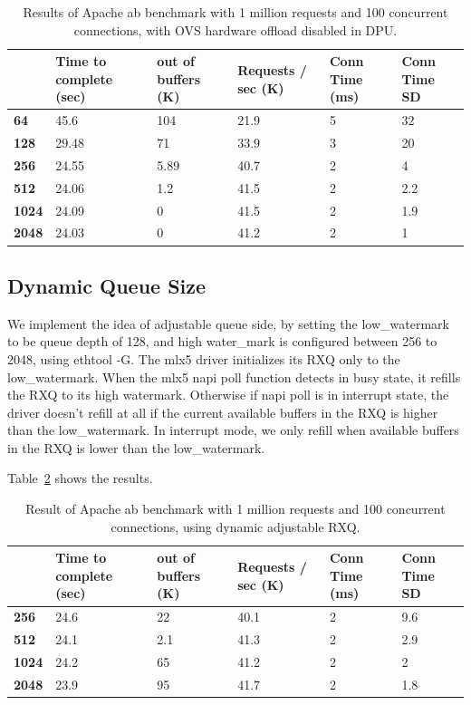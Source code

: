 \documentclass[letterpaper]{article}
\begin{document}
\begin{table}[h!]
\centering
\footnotesize
\begin{tabular}{|p{0.6cm}|p{1.2cm}|p{1.2cm}|p{1.2cm}|p{0.8cm}|p{1cm}|} \hline
\textbf{} & \textbf{Time to complete (sec)} & \textbf{out of buffers (K)} & \textbf{Requests / sec (K)} & \textbf{Conn Time (ms)} & \textbf{Conn Time SD} \\ \hline \hline
\textbf{64}   & 45.6  & 104   & 21.9 & 5 & 32  \\ \hline
\textbf{128}  & 29.48 & 71    & 33.9 & 3 & 20  \\ \hline \hline
\textbf{256}  & 24.55 & 5.89  & 40.7 & 2 & 4   \\ \hline
\textbf{512}  & 24.06 & 1.2   & 41.5 & 2 & 2.2 \\ \hline
\textbf{1024} & 24.09 & 0     & 41.5 & 2 & 1.9 \\ \hline
\textbf{2048} & 24.03 & 0     & 41.2 & 2 & 1   \\ \hline
\end{tabular}
\caption{Results of Apache ab benchmark with 1 million requests and 100 concurrent
connections, with OVS hardware offload disabled in DPU.}
\label{tab:ab1}
\end{table}


\subsection{Dynamic Queue Size}
We implement the idea of adjustable queue side, by setting the low\_watermark to
be queue depth of 128, and high water\_mark is configured between 256 to 2048, using
ethtool -G. The mlx5 driver initializes its RXQ only to the low\_watermark.
When the mlx5 napi poll function detects in busy state, it refills the
RXQ to its high watermark. Otherwise if napi poll is in interrupt state, the driver
doesn't refill at all if the current available buffers in the RXQ is higher than
the low\_watermark. In interrupt mode, we only refill when available buffers in the RXQ
is lower than the low\_watermark.

Table~\ref{tab:ab2} shows the results.
\begin{table}[h!]
\centering
\footnotesize
\begin{tabular}{|p{0.6cm}|p{1.2cm}|p{1.2cm}|p{1.2cm}|p{0.8cm}|p{1cm}|} \hline
\textbf{} & \textbf{Time to complete (sec)} & \textbf{out of buffers (K)} & \textbf{Requests / sec (K)} & \textbf{Conn Time (ms)} & \textbf{Conn Time SD} \\ \hline \hline
\textbf{256}  & 24.6  & 22   & 40.1 & 2 & 9.6 \\ \hline
\textbf{512}  & 24.1  & 2.1  & 41.3 & 2 & 2.9 \\ \hline
\textbf{1024} & 24.2  & 65   & 41.2 & 2 & 2   \\ \hline
\textbf{2048} & 23.9  & 95   & 41.7 & 2 & 1.8 \\ \hline
\end{tabular}
\caption{Result of Apache ab benchmark with 1 million requests and 100 concurrent connections, using dynamic adjustable RXQ.}
\label{tab:ab2}
\end{table}
\end{document}

